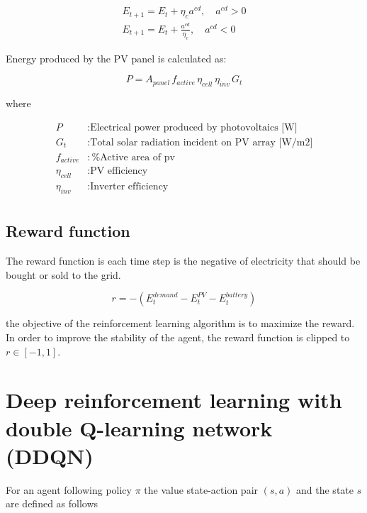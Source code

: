 \documentclass[journal]{IEEEtran}
\begin{document}
\begin{align}
E_{t+1} = E_t + \eta_c a^{cd}, \quad a^{cd} > 0 \\
E_{t+1} = E_t + \frac{ a^{cd}}{\eta_c}, \quad a^{cd} < 0
\end{align}

Energy produced by the PV panel is calculated as:

\begin{equation}
P = A_{panel} \, f_{active}  \, \eta_{cell} \, \eta_{inv} \, G_t
\end{equation}

where

\begin{align*}
P &:  \textrm{Electrical power produced by photovoltaics [W]} \\
G_t&: \textrm{Total solar radiation incident on PV array [W/m2]} \\
f_{active}&: \% \textrm{Active area of pv} \\
\eta_{cell}&: \textrm{PV efficiency} \\
\eta_{inv}&: \textrm{Inverter efficiency} \\
\end{align*}

\subsection{Reward function}\label{reward-function}

The reward function is each time step is the negative of electricity
that should be bought or sold to the grid.

\begin{equation}
r = -(E_t^{demand} - E_t^{PV} - E_t^{battery})
\end{equation}

the objective of the reinforcement learning algorithm is to maximize the
reward. In order to improve the stability of the agent, the reward
function is clipped to \(r \in [-1, 1]\).


\section{Deep reinforcement learning with double Q-learning
network
(DDQN)}\label{deep-reinforcement-learning-with-double-q-learning-network-ddqn}

For an agent following policy \(\pi\) the value state-action pair
\((s, a)\) and the state \(s\) are defined as follows
\end{document}
